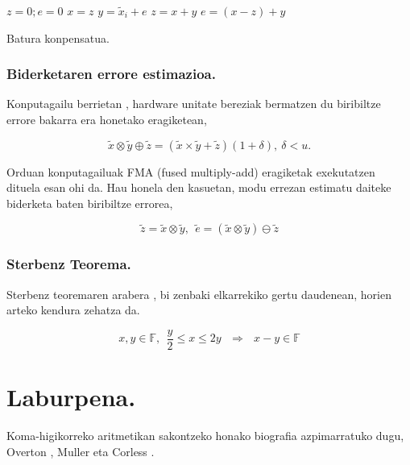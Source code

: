 \begin{algorithm}[H]
 \BlankLine
  $z=0; e=0$\;
  {
   \BlankLine
    $x=z$\;
    $y=\tilde x_i+e$\;
    $z=x+y$\;
    $e=(x-z)+y$\;
   \BlankLine
  }
 \caption{Batura konpensatua.}
\end{algorithm}

\subsubsection*{Biderketaren errore estimazioa.}
Konputagailu berrietan , hardware unitate bereziak bermatzen du biribiltze errore bakarra era honetako eragiketean,

\begin{equation*}
\tilde x \otimes \tilde y \oplus \tilde z= (\tilde x \times \tilde y+ \tilde z) (1+\delta), \ \delta<u.
\end{equation*}

Orduan konputagailuak FMA (fused multiply-add) eragiketak exekutatzen dituela esan ohi da. Hau honela den kasuetan, modu errezan estimatu daiteke biderketa baten biribiltze errorea,


\begin{equation*}
\tilde{z}=\tilde{x}\otimes\tilde{y}, \ \ \tilde{e}=(\tilde{x}\otimes\tilde{y})\ominus \tilde{z}
\end{equation*}


\subsubsection*{Sterbenz Teorema.}
Sterbenz teoremaren arabera \cite{Sterbenz1973}, bi zenbaki elkarrekiko  gertu daudenean,  horien arteko kendura zehatza da.

\begin{equation}
\label{eq:4311}
x,y \in \mathbb{F}, \ \ \frac{y}{2}\leq x \leq 2y \ \ \ \Rightarrow \ \ \ x-y\in \mathbb{F}
\end{equation}




\section{Laburpena.}

Koma-higikorreko aritmetikan sakontzeko honako biografia azpimarratuko dugu, Overton \cite{Overton2001}, Muller  \cite{Muller2009} eta Corless \cite{Corless2013}.

